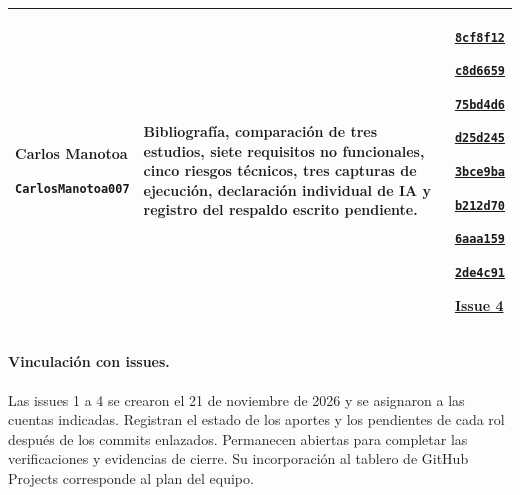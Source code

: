 {\begin{table}[H]
\begin{tabular}{|>{\raggedright\arraybackslash}p{}|>{\raggedright\arraybackslash}p{}|>{\raggedright\arraybackslash}p{}|}
    Carlos Manotoa\par\texttt{CarlosManotoa007} &
    Bibliografía, comparación de tres estudios, siete requisitos no
    funcionales, cinco riesgos técnicos, tres capturas de ejecución,
    declaración individual de IA y registro del respaldo escrito pendiente. &
    \href{https://github.com/Danxxx777/clab-pfc-7a/commit/8cf8f12}{\texttt{8cf8f12}}\par
    \href{https://github.com/Danxxx777/clab-pfc-7a/commit/c8d6659}{\texttt{c8d6659}}\par
    \href{https://github.com/Danxxx777/clab-pfc-7a/commit/75bd4d6}{\texttt{75bd4d6}}\par
    \href{https://github.com/Danxxx777/clab-pfc-7a/commit/d25d245}{\texttt{d25d245}}\par
    \href{https://github.com/Danxxx777/clab-pfc-7a/commit/3bce9ba}{\texttt{3bce9ba}}\par
    \href{https://github.com/Danxxx777/clab-pfc-7a/commit/b212d70}{\texttt{b212d70}}\par
    \href{https://github.com/Danxxx777/clab-pfc-7a/commit/6aaa159}{\texttt{6aaa159}}\par
    \href{https://github.com/Danxxx777/clab-pfc-7a/commit/2de4c91}{\texttt{2de4c91}}\par
    \href{https://github.com/Danxxx777/clab-pfc-7a/issues/4}{Issue 4}
    \\ \hline
  \end{tabular}
  \end{table}

  \paragraph{Vinculación con issues.}
  Las issues 1 a 4 se crearon el 21 de noviembre de 2026 y se asignaron a
  las cuentas indicadas. Registran el estado de los aportes y los pendientes
  de cada rol después de los commits enlazados. Permanecen abiertas para
  completar las verificaciones y evidencias de cierre. Su incorporación
  al tablero de GitHub Projects corresponde al plan del equipo.
}

\newcommand{\ByronDeclaracionIntegracion}{%
  \paragraph{Byron Daniel Loor Mendoza, Responsable de Documentación.}
  El documento toma como base el informe original de CLAB y los aportes
  versionados del equipo. Utilicé OpenAI Codex (familia de modelos GPT-6)
  para organizar y adaptar ese material, preparar borradores técnicos,
  integrar los archivos LaTeX y revisar ortografía y puntuación.
  La revisión documental asistida incluyó el contraste con los requisitos
  del antecedente, las citas y enlaces, la compilación del informe y la
  revisión visual del PDF.
}

